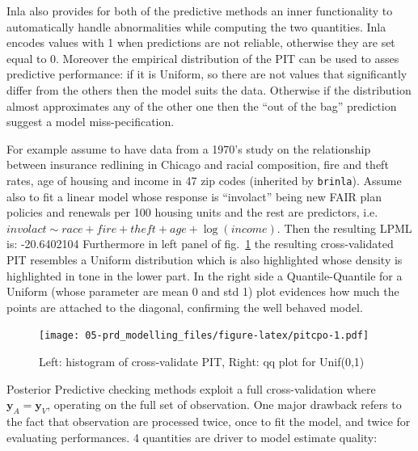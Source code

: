\documentclass[
  12pt,
  a4paper,
  oneside]{book}
\newcommand{\passthrough}[1]{#1}
\theoremstyle{definition}
\theoremstyle{definition}
\theoremstyle{definition}
\theoremstyle{remark}
\begin{document}
Inla also provides for both of the predictive methods an inner functionality to automatically handle abnormalities while computing the two quantities. Inla encodes values with 1 when predictions are not reliable, otherwise they are set equal to 0. Moreover the empirical distribution of the PIT can be used to asses predictive performance: if it is Uniform, so there are not values that significantly differ from the others then the model suits the data. Otherwise if the distribution almost approximates any of the other one then the ``out of the bag'' prediction suggest a model miss-pecification.

For example assume to have data from a 1970's study on the relationship between insurance redlining in Chicago and racial composition, fire and theft rates, age of housing and income in 47 zip codes (inherited by \passthrough{\lstinline!brinla!}\citep{brinla}). Assume also to fit a linear model whose response is ``involact'' being new FAIR plan policies and renewals per 100 housing units and the rest are predictors, i.e.~\(involact \sim race + fire +theft + age + \log(income)\).
Then the resulting LPML is: -20.6402104
Furthermore in left panel of fig.~\ref{fig:pitcpo} the resulting cross-validated PIT resembles a Uniform distribution which is also highlighted whose density is highlighted in tone in the lower part. In the right side a Quantile-Quantile for a Uniform (whose parameter are mean 0 and std 1) plot evidences how much the points are attached to the diagonal, confirming the well behaved model.

\begin{figure}
\centering
\texttt{[image: 05-prd\_modelling\_files/figure-latex/pitcpo-1.pdf]}
\caption{\label{fig:pitcpo}Left: histogram of cross-validate PIT, Right: qq plot for Unif(0,1)}
\end{figure}

Posterior Predictive checking methods \citep{gelman1996posterior} exploit a full cross-validation where \(\boldsymbol{y}_{A} = \boldsymbol{y}_{V}\), operating on the full set of observation. One major drawback refers to the fact that observation are processed twice, once to fit the model, and twice for evaluating performances. 4 quantities are driver to model estimate quality:
\end{document}
